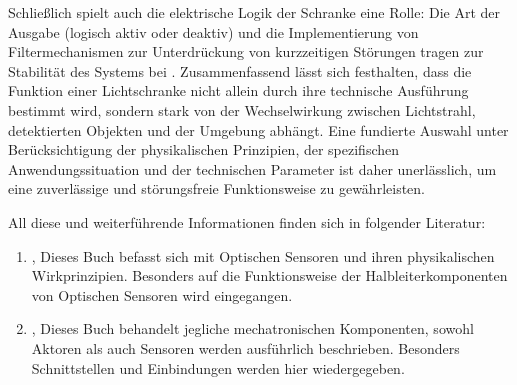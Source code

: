 Schließlich spielt auch die elektrische Logik der Schranke eine Rolle: Die Art der Ausgabe (logisch aktiv oder deaktiv) und die Implementierung von Filtermechanismen zur Unterdrückung von kurzzeitigen Störungen tragen zur Stabilität des Systems bei \cite{Roddeck:2023}. 
Zusammenfassend lässt sich festhalten, dass die Funktion einer Lichtschranke nicht allein durch ihre technische Ausführung bestimmt wird, sondern stark von der Wechselwirkung zwischen Lichtstrahl, detektierten Objekten und der Umgebung abhängt. Eine fundierte Auswahl unter Berücksichtigung der physikalischen Prinzipien, der spezifischen Anwendungssituation und der technischen Parameter ist daher unerlässlich, um eine zuverlässige und störungsfreie Funktionsweise zu gewährleisten.

All diese und weiterführende Informationen finden sich in folgender Literatur: 
\begin{center}
	\begin{enumerate}
		\item \cite{Loeffler-Mang:2012}, Dieses Buch befasst sich mit Optischen Sensoren und ihren physikalischen Wirkprinzipien. Besonders auf die Funktionsweise der Halbleiterkomponenten von Optischen Sensoren wird eingegangen.  
		\item \cite{Roddeck:2023}, Dieses Buch behandelt jegliche mechatronischen Komponenten, sowohl Aktoren als auch Sensoren werden ausführlich beschrieben. Besonders Schnittstellen und Einbindungen werden hier wiedergegeben. 
	\end{enumerate}
\end{center}
